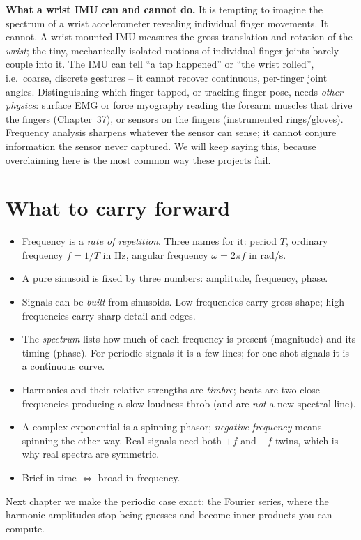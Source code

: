 \begin{trapbox}
\textbf{What a wrist IMU can and cannot do.}
It is tempting to imagine the spectrum of a wrist accelerometer revealing individual
finger movements. It cannot. A wrist-mounted IMU measures the gross translation and
rotation of the \emph{wrist}; the tiny, mechanically isolated motions of individual
finger joints barely couple into it. The IMU can tell ``a tap happened'' or ``the
wrist rolled'', i.e.\ coarse, discrete gestures -- it cannot recover continuous,
per-finger joint angles. Distinguishing which finger tapped, or tracking finger pose,
needs \emph{other physics}: surface EMG or force myography reading the forearm
muscles that drive the fingers (Chapter~37), or sensors on the fingers
(instrumented rings/gloves). Frequency analysis sharpens whatever the sensor can
sense; it cannot conjure information the sensor never captured. We will keep saying
this, because overclaiming here is the most common way these projects fail.
\end{trapbox}

\section{What to carry forward}

\begin{recoverybox}
\begin{itemize}
  \item Frequency is a \emph{rate of repetition}. Three names for it: period $T$,
        ordinary frequency $f=1/T$ in Hz, angular frequency $\omega=2\pi f$ in rad/s.
  \item A pure sinusoid is fixed by three numbers: amplitude, frequency, phase.
  \item Signals can be \emph{built} from sinusoids. Low frequencies carry gross
        shape; high frequencies carry sharp detail and edges.
  \item The \emph{spectrum} lists how much of each frequency is present (magnitude)
        and its timing (phase). For periodic signals it is a few lines; for
        one-shot signals it is a continuous curve.
  \item Harmonics and their relative strengths are \emph{timbre}; beats are two close
        frequencies producing a slow loudness throb (and are \emph{not} a new
        spectral line).
  \item A complex exponential is a spinning phasor; \emph{negative frequency}
        means spinning the other way. Real signals need both $+f$ and $-f$ twins,
        which is why real spectra are symmetric.
  \item Brief in time $\Leftrightarrow$ broad in frequency.
\end{itemize}
Next chapter we make the periodic case exact: the Fourier series, where the harmonic
amplitudes stop being guesses and become inner products you can compute.
\end{recoverybox}

